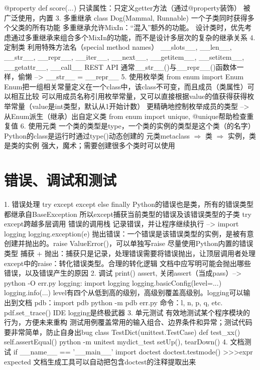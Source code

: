 \documentclass{report}
\begin{document}
        @property
        def score(...)
   只读属性：只定义getter方法（通过@property装饰）
   被广泛使用，内置
3. 多重继承
   class Dog(Mammal, Runnable)
   一个子类同时获得多个父类的所有功能 
   多重继承允许MixIn：“混入”额外的功能。
   设计类时，优先考虑通过多重继承来组合多个MixIn的功能，而不是设计多层次的复杂的继承关系 
4. 定制类 
   利用特殊方法名（special method names）
   __slots__, __len__, __str__, __repr__, __iter__, __next__, __getitem__, __setitem__, __getattr__, __call__ 
   REST API 
   通常__str__()与__repr__()函数体一样，偷懒 --> __str__ = __repr__ 
5. 使用枚举类 
   from enum import Enum 
   Enum把一组相关常量定义在一个class中，该class不可变，而且成员（类属性）可以相互比较 
   可以用成员名称引用枚举常量，又可以直接根据value的值获得获得枚举常量（value是int类型，默认从1开始计数）
   更精确地控制枚举成员的类型 --> 从Enum派生（继承）出自定义类
   from enum import unique, @unique帮助检查重复值 
6. 使用元类 
   一个类的类型是type，一个类的实例的类型是这个类（的名字）
   Python的class是运行时通过type()动态创建的
   元类metaclass $\Rightarrow$ 类 $\Rightarrow$ 实例，类是类的实例 
   强大，魔术；需要创建很多个类时可以使用
\section{错误、调试和测试}
1. 错误处理 
   try except except else finally 
   Python的错误也是类，所有的错误类型都继承自BaseException 
   所以except捕获当前类型的错误及该错误类型的子类 
   try except跨越多层调用
   错误的调用栈 
   记录错误，并让程序继续执行 --> import logging
                              logging.exception(e) 
   抛出错误：一个错误是该错误类型的实例，是被有意创建并抛出的。raise ValueError()，可以单独写raise 
   尽量使用Python内置的错误类型 
   捕获 + 抛出：捕获只是记录，处理错误需要将错误抛出，让顶层调用者处理 
   except中的raise：转化错误类型。合理的转化逻辑 
   文档中应写明可能会抛出哪些错误，以及错误产生的原因 
2. 调试 
   print() 
   assert, 关闭assert（当成pass）--> python -O err.py  
   logging: import logging 
            logging.basicConfig(level=...)
            logging.info(...) 
   level有四个从低到高的级别，高级别覆盖高级别。logging可以输出到文档
   pdb：import pdb 
        python -m pdb err.py 
        命令：l, n, p, q, etc. 
        pdf.set_trace() 
   IDE 
   logging是终极武器
3. 单元测试 
   有效地测试某个程序模块的行为，方便未来重构 
   测试用例覆盖常用的输入组合、边界条件和异常；测试代码要非常简单，防止自身出bug 
   class TestDict(unittest.TestCase)
   def test_xx()
       self.assertEqual() 
   python -m unitest mydict_test 
   setUp(), tearDown() 
4. 文档测试 
   if __name__ == '__main__' 
       import doctest
       doctest.testmode()
   >>>expr 
   expected 
   文档生成工具可以自动把包含doctest的注释提取出来 
\end{document}
